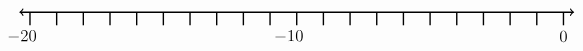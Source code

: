 \documentclass[leqno, 12pt]{article}
\begin{document}
\vspace{10pt}\begin{equation}
    \begin{tikzpicture}[scale=0.67, baseline={([yshift=-1pt]current bounding box.north)}]
        \draw[{To[scale=1.3]}-{To[scale=1.3]}, line width=1pt] (-20.4, 0) -- (0.4, 0);
        \foreach \x in {-20,-19,...,0}
            \draw[shift={(\x,0)},color=black, line width=1pt] (0pt,-14pt) -- (0pt,0pt);
        \foreach \x in {-20,-10}
            \draw[shift={(\x -0.3,-0.8)},color=black] node[font=\large,text height=12pt] {$\x$};
        \foreach \x in {0}
            \draw[shift={(\x,-0.8)},color=black] node[font=\large,text height=12pt] {$\x$};
        \node [font=\large, anchor=east] at (5,1.65) {$  $};
    \end{tikzpicture}
\end{equation}

\vspace{10pt}
\end{document}

